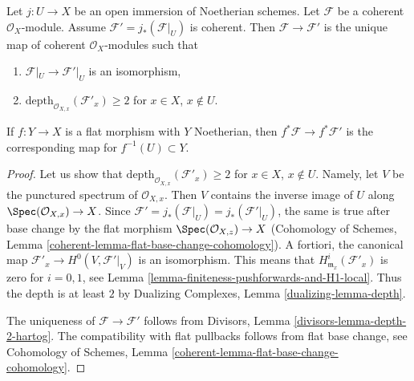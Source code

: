 \begin{lemma}
\label{lemma-get-depth-2-along-Z}
Let $j : U \to X$ be an open immersion of Noetherian schemes.
Let $\mathcal{F}$ be a coherent $\mathcal{O}_X$-module.
Assume $\mathcal{F}' = j_*(\mathcal{F}|_U)$ is coherent.
Then $\mathcal{F} \to \mathcal{F}'$ is the unique map
of coherent $\mathcal{O}_X$-modules such that
\begin{enumerate}
\item $\mathcal{F}|_U \to \mathcal{F}'|_U$
is an isomorphism,
\item $\text{depth}_{\mathcal{O}_{X, x}}(\mathcal{F}'_x) \geq 2$
for $x \in X$, $x \not \in U$.
\end{enumerate}
If $f : Y \to X$ is a flat morphism with $Y$ Noetherian, then
$f^*\mathcal{F} \to f^*\mathcal{F}'$ is the corresponding
map for $f^{-1}(U) \subset Y$.
\end{lemma}

\begin{proof}
Let us show that $\text{depth}_{\mathcal{O}_{X, x}}(\mathcal{F}'_x) \geq 2$
for $x \in X$, $x \not \in U$. Namely, let $V$ be the punctured spectrum of
$\mathcal{O}_{X, x}$. Then $V$ contains the inverse image of
$U$ along $\Spec(\mathcal{O}_{X, x}) \to X$.
Since $\mathcal{F}' = j_*(\mathcal{F}|_U) =
j_*(\mathcal{F}'|_U)$, the same is true after
base change by the flat morphism $\Spec(\mathcal{O}_{X, z}) \to X$
(Cohomology of Schemes, Lemma
\ref{coherent-lemma-flat-base-change-cohomology}).
A fortiori, the canonical map
$\mathcal{F}'_x \to H^0(V, \mathcal{F}'|_V)$
is an isomorphism. This means that $H^i_{\mathfrak m_x}(\mathcal{F}'_x)$
is zero for $i = 0, 1$, see
Lemma \ref{lemma-finiteness-pushforwards-and-H1-local}.
Thus the depth is at least $2$ by
Dualizing Complexes, Lemma \ref{dualizing-lemma-depth}.

\medskip\noindent
The uniqueness of $\mathcal{F} \to \mathcal{F}'$ follows from
Divisors, Lemma \ref{divisors-lemma-depth-2-hartog}.
The compatibility with flat pullbacks follows from
flat base change, see Cohomology of Schemes, Lemma
\ref{coherent-lemma-flat-base-change-cohomology}.
\end{proof}

